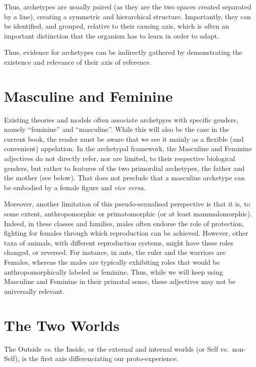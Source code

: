 \documentclass[]{book}
\begin{document}
Thus, archetypes are usually paired (as they are the two spaces created separated by a line), creating a symmetric and hierarchical structure. Importantly, they can be identified, and grouped, relative to their causing axis, which is often an important distinction that the organism has to learn in order to adapt.

Thus, evidence for archetypes can be indirectly gathered by demonstrating the existence and relevance of their axis of reference.

\hypertarget{masculine-and-feminine}{%
\section{Masculine and Feminine}\label{masculine-and-feminine}}

Existing theories and models often associate archetpyes with specific genders, namely ``feminine'' and ``masculine''. While this will also be the case in the current book, the reader must be aware that we see it mainly as a flexible (and convenient) appelation. In the archetypal framework, the Masculine and Feminine adjectives do not directly refer, nor are limited, to their respective biological genders, but rather to features of the two primordial archetypes, the father and the mother (see below). That does not preclude that a masculine archetype can be embodied by a female figure and \emph{vice versa}.

Moreover, another limitation of this pseudo-sexualised perspective is that it is, to some extent, anthropomorphic or primatomorphic (or at least mammalomorphic). Indeed, in these classes and families, males often endorse the role of protection, fighting for females through which reproduction can be achieved. However, other taxa of animals, with different reproduction systems, might have these roles changed, or reversed. For instance, in ants, the ruler and the warriors are Females, whereas the males are typically exhibiting roles that would be anthropomorphically labeled as feminine. Thus, while we will keep using Masculine and Feminine in their primatal sense, these adjectives may not be universally relevant.

\hypertarget{the-two-worlds}{%
\section{The Two Worlds}\label{the-two-worlds}}

The Outside \emph{vs.} the Inside, or the external and internal worlds (or Self vs.~non-Self), is the first axis differenciating our proto-experience.
\end{document}
